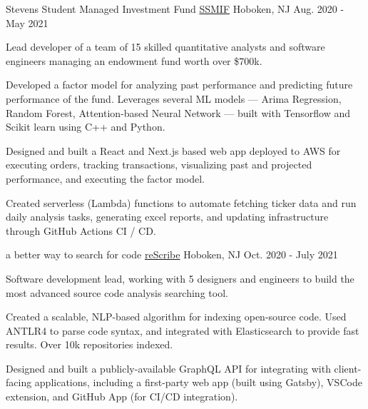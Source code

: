 

\begin{cventries}

  \cventry
  {Stevens Student Managed Investment Fund} %
  {\href{https://bailey.ssmif.com}{SSMIF}} %
  {Hoboken, NJ} %
  {Aug. 2020 - May 2021} %
  {
    \begin{cvitems} %
      \item {Lead developer of a team of 15 skilled quantitative analysts and software engineers managing an endowment fund worth over \$700k.}
      \item {Developed a factor model for analyzing past performance and predicting future performance of the fund. Leverages several ML models --- Arima Regression, Random Forest, Attention-based Neural Network --- built with Tensorflow and Scikit learn using C++ and Python.}
      \item {Designed and built a React and Next.js based web app deployed to AWS for executing orders, tracking transactions, visualizing past and projected performance, and executing the factor model.}
      \item {Created serverless (Lambda) functions to automate fetching ticker data and run daily analysis tasks, generating excel reports, and updating infrastructure through GitHub Actions CI / CD.}
    \end{cvitems}
  }

  \cventry
  {a better way to search for code} %
  {\href{https://rescribe.dev}{reScribe}} %
  {Hoboken, NJ} %
  {Oct. 2020 - July 2021} %
  {
    \begin{cvitems} %
      \item {Software development lead, working with 5 designers and engineers to build the most advanced source code analysis searching tool.}
      \item {Created a scalable, NLP-based algorithm for indexing open-source code. Used ANTLR4 to parse code syntax, and integrated with Elasticsearch to provide fast results. Over 10k repositories indexed.}
      \item {Designed and built a publicly-available GraphQL API for integrating with client-facing applications, including a first-party web app (built using Gatsby), VSCode extension, and GitHub App (for CI/CD integration).}
    \end{cvitems}
  }


\end{cventries}
